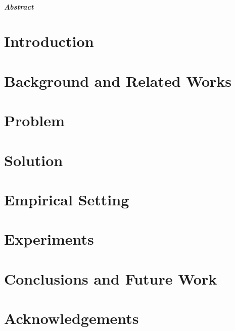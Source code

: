 \documentclass[12pt, titlepage, a4paper]{book}
\begin{document}
\begin{frontespizio}
\Rientro {1.5cm}
\end{frontespizio}



\tableofcontents

\newpage

\paragraph{Abstract}


\chapter{Introduction}\label{chap:intro}



\chapter{Background and Related Works}\label{chap:related}


\chapter{Problem}\label{chap:problem}



\chapter{Solution}\label{chap:solution}


\chapter{Empirical Setting} \label{chap:ros}


\chapter{Experiments}\label{chap:experiments}


\chapter{Conclusions and Future Work}\label{chap:conclusions}


\chapter*{Acknowledgements}

% 
% 
\end{document}
